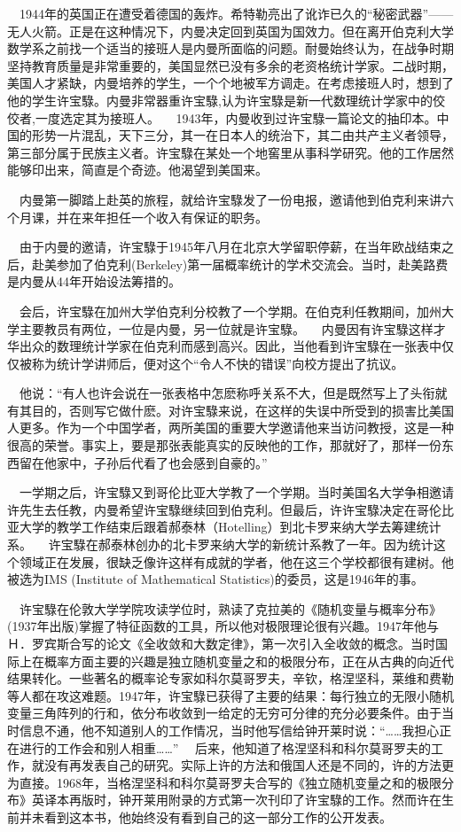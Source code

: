 $\quad$1944年的英国正在遭受着德国的轰炸。希特勒亮出了讹诈已久的“秘密武器”——无人火箭。正是在这种情况下，内曼决定回到英国为国效力。但在离开伯克利大学数学系之前找一个适当的接班人是内曼所面临的问题。耐曼始终认为，在战争时期坚持教育质量是非常重要的，美国显然已没有多余的老资格统计学家。二战时期，美国人才紧缺，内曼培养的学生，一个个地被军方调走。在考虑接班人时，想到了他的学生许宝騄。内曼非常器重许宝騄,认为许宝騄是新一代数理统计学家中的佼佼者,一度选定其为接班人。
$\quad$1943年，内曼收到过许宝騄一篇论文的抽印本。中国的形势一片混乱，天下三分，其一在日本人的统治下，其二由共产主义者领导，第三部分属于民族主义者。许宝騄在某处一个地窖里从事科学研究。他的工作居然能够印出来，简直是个奇迹。他渴望到美国来。

$\quad$内曼第一脚踏上赴英的旅程，就给许宝騄发了一份电报，邀请他到伯克利来讲六个月课，并在来年担任一个收入有保证的职务。

$\quad$由于内曼的邀请，许宝騄于1945年八月在北京大学留职停薪，在当年欧战结束之后，赴美参加了伯克利(Berkeley)第一届概率统计的学术交流会。当时，赴美路费是内曼从44年开始设法筹措的。

$\quad$会后，许宝騄在加州大学伯克利分校教了一个学期。在伯克利任教期间，加州大学主要教员有两位，一位是内曼，另一位就是许宝騄。
$\quad$内曼因有许宝騄这样才华出众的数理统计学家在伯克利而感到高兴。因此，当他看到许宝騄在一张表中仅仅被称为统计学讲师后，便对这个“令人不快的错误”向校方提出了抗议。

$\quad$他说：“有人也许会说在一张表格中怎麽称呼关系不大，但是既然写上了头衔就有其目的，否则写它做什麽。对许宝騄来说，在这样的失误中所受到的损害比美国人更多。作为一个中国学者，两所美国的重要大学邀请他来当访问教授，这是一种很高的荣誉。事实上，要是那张表能真实的反映他的工作，那就好了，那样一份东西留在他家中，子孙后代看了也会感到自豪的。”

$\quad$一学期之后，许宝騄又到哥伦比亚大学教了一个学期。当时美国名大学争相邀请许先生去任教，内曼希望许宝騄继续回到伯克利。但最后，许许宝騄决定在哥伦比亚大学的教学工作结束后跟着郝泰林（Hotelling）到北卡罗来纳大学去筹建统计系。
$\quad$许宝騄在郝泰林创办的北卡罗来纳大学的新统计系教了一年。因为统计这个领域正在发展，很缺乏像许这样有成就的学者，他在这三个学校都很有建树。他被选为IMS (Institute of Mathematical Statistics)的委员，这是1946年的事。

$\quad$许宝騄在伦敦大学学院攻读学位时，熟读了克拉美的《随机变量与概率分布》(1937年出版)掌握了特征函数的工具，所以他对极限理论很有兴趣。1947年他与Ｈ．罗宾斯合写的论文《全收敛和大数定律》，第一次引入全收敛的概念。当时国际上在概率方面主要的兴趣是独立随机变量之和的极限分布，正在从古典的向近代结果转化。一些著名的概率论专家如科尔莫哥罗夫，辛钦，格涅坚科，莱维和费勒等人都在攻这难题。1947年，许宝騄已获得了主要的结果：每行独立的无限小随机变量三角阵列的行和，依分布收敛到一给定的无穷可分律的充分必要条件。由于当时信息不通，他不知道别人的工作情况，当时他写信给钟开莱时说：“……我担心正在进行的工作会和别人相重……”
$\quad$后来，他知道了格涅坚科和科尔莫哥罗夫的工作，就没有再发表自己的研究。实际上许的方法和俄国人还是不同的，许的方法更为直接。1968年，当格涅坚科和科尔莫哥罗夫合写的《独立随机变量之和的极限分布》英译本再版时，钟开莱用附录的方式第一次刊印了许宝騄的工作。然而许在生前并未看到这本书，他始终没有看到自己的这一部分工作的公开发表。

